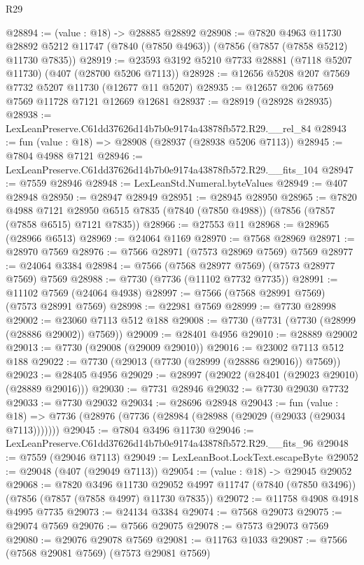\begin{lexlean}{R29}
\begin{coremodule}
@28894 := (value : @18) -> @28885 @28892
@28908 := @7820
    @4963
    @11730
    @28892
    @5212
    @11747
    (@7840 (@7850 @4963))
    (@7856 (@7857 (@7858 @5212) @11730 @7835))
@28919 := @23593 @3192 @5210 @7733 @28881 (@7118 @5207 @11730) (@407 (@28700 @5206 @7113))
@28928 := @12656 @5208 @207 @7569 @7732 @5207 @11730 (@12677 @11 @5207)
@28935 := @12657 @206 @7569 @7569 @11728 @7121 @12669 @12681
@28937 := @28919 (@28928 @28935)
@28938 := LexLeanPreserve.C61dd37626d14b7b0e9174a43878fb572.R29.__rel_84
@28943 := fun (value : @18) => @28908 (@28937 (@28938 @5206 @7113))
@28945 := @7804 @4988 @7121
@28946 := LexLeanPreserve.C61dd37626d14b7b0e9174a43878fb572.R29.__fits_104
@28947 := @7559 @28946
@28948 := LexLeanStd.Numeral.byteValues
@28949 := @407 @28948
@28950 := @28947 @28949
@28951 := @28945 @28950
@28965 := @7820
    @4988
    @7121
    @28950
    @6515
    @7835
    (@7840 (@7850 @4988))
    (@7856 (@7857 (@7858 @6515) @7121 @7835))
@28966 := @27553 @11
@28968 := @28965 (@28966 @6513)
@28969 := @24064 @1169
@28970 := @7568 @28969
@28971 := @28970 @7569
@28976 := @7566 @28971 (@7573 @28969 @7569) @7569
@28977 := @24064 @3384
@28984 := @7566 (@7568 @28977 @7569) (@7573 @28977 @7569) @7569
@28988 := @7730 (@7736 (@11102 @7732 @7735))
@28991 := @11102 @7569 (@24064 @4938)
@28997 := @7566 (@7568 @28991 @7569) (@7573 @28991 @7569)
@28998 := @22981 @7569
@28999 := @7730 @28998
@29002 := @23060 @7113 @512 @188
@29008 := @7730 (@7731 (@7730 (@28999 (@28886 @29002)) @7569))
@29009 := @28401 @4956
@29010 := @28889 @29002
@29013 := @7730 (@29008 (@29009 @29010))
@29016 := @23002 @7113 @512 @188
@29022 := @7730 (@29013 (@7730 (@28999 (@28886 @29016)) @7569))
@29023 := @28405 @4956
@29029 := @28997 (@29022 (@28401 (@29023 @29010) (@28889 @29016)))
@29030 := @7731 @28946
@29032 := @7730 @29030 @7732
@29033 := @7730 @29032
@29034 := @28696 @28948
@29043 := fun (value : @18) =>
  @7736 (@28976 (@7736 (@28984 (@28988 (@29029 (@29033 (@29034 @7113)))))))
@29045 := @7804 @3496 @11730
@29046 := LexLeanPreserve.C61dd37626d14b7b0e9174a43878fb572.R29.__fits_96
@29048 := @7559 (@29046 @7113)
@29049 := LexLeanBoot.LockText.escapeByte
@29052 := @29048 (@407 (@29049 @7113))
@29054 := (value : @18) -> @29045 @29052
@29068 := @7820
    @3496
    @11730
    @29052
    @4997
    @11747
    (@7840 (@7850 @3496))
    (@7856 (@7857 (@7858 @4997) @11730 @7835))
@29072 := @11758 @4908 @4918 @4995 @7735
@29073 := @24134 @3384
@29074 := @7568 @29073
@29075 := @29074 @7569
@29076 := @7566 @29075
@29078 := @7573 @29073 @7569
@29080 := @29076 @29078 @7569
@29081 := @11763 @1033
@29087 := @7566 (@7568 @29081 @7569) (@7573 @29081 @7569)

\end{coremodule}
\end{lexlean}

